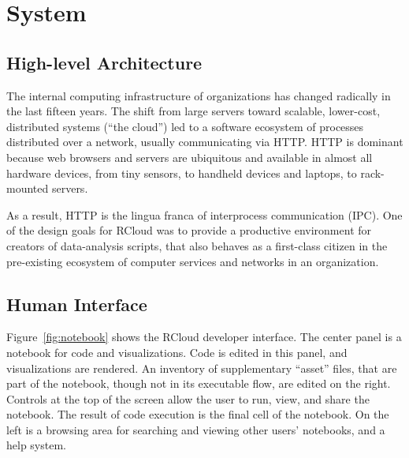 \section{System\label{sec:system}}

\subsection{High-level Architecture\label{sec:highlevelarchitecture}}


The internal computing infrastructure of organizations has changed
radically in the last fifteen years. The shift from large
servers toward scalable, lower-cost, distributed systems (``the cloud'')
led to a software ecosystem of processes distributed over a
network, usually communicating via HTTP. HTTP is dominant because
web browsers and servers are ubiquitous and available in almost
all hardware devices, from tiny sensors, to handheld devices and
laptops, to rack-mounted servers.

As a result, HTTP is the lingua franca of interprocess communication
(IPC). One of the design goals for RCloud was to provide a productive
environment for creators of data-analysis scripts, that also behaves
as a first-class citizen in the pre-existing ecosystem of computer
services and networks in an organization.


\subsection{Human Interface\label{sec:humaninterface}}


Figure~\ref{fig:notebook} shows the RCloud developer interface.  The center
panel is a notebook for code and visualizations.  Code is edited in this panel,
and visualizations are rendered.  An inventory of supplementary ``asset'' files,
that are part of the notebook, though not in its executable flow, are edited on
the right.  Controls at the top of the screen allow the user to run, view, and
share the notebook.  The result of code execution is the final cell of the notebook.  On the
left is a browsing area for searching and viewing other users' notebooks, and a
help system.

